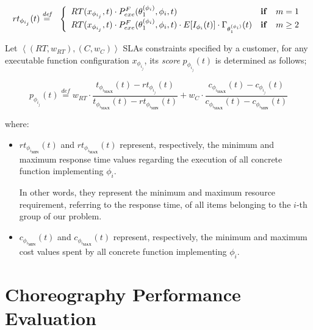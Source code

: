 \documentclass[12pt,a4paper]{report}
\newcommand{\mathDef}{\overset{\textit{def}}{=}}
\begin{document}
\begin{eqnarray}
	rt_{\phi_{i_{j}}}(t) & \mathDef & \left\{ 
	\begin{array}{lcl}
	RT(x_{\phi_{i_{j}}},t) \cdot P_{exe}^{F}(\theta^{(\phi_i)}_1, \phi_i,t) & \text{\textbf{if}} & m = 1 \nonumber \\ 
	RT(x_{\phi_{i_{j}}},t) \cdot P_{exe}^{F}(\theta^{(\phi_i)}_1, \phi_i,t) \cdot E[I_{\phi_i}(t)] \cdot \Gamma_{\theta_1^{(\phi_{i})}}(t) & \text{\textbf{if}} & m \geq 2 \\ 
\end{array} \right.\label{responseTime}\\
\end{eqnarray}

Let $\left\langle (RT,w_{RT}),(C,w_{C}) \right\rangle$ SLAs constraints specified by a customer, for any executable function configuration $x_{\phi_{i_j}}$, its \textit{score} $p_{\phi_{i_{j}}}(t)$ is determined as follows;

\begin{equation}\label{profit}
	p_{\phi_{i_{j}}}(t) \mathDef w_{RT} \cdot \dfrac{t_{\phi_{i_{\textbf{MAX}}}}(t) - rt_{\phi_{i_{j}}}(t)}{t_{\phi_{i_{\textbf{MAX}}}}(t) - rt_{\phi_{i_{\textbf{MIN}}}}(t)} + w_{C} \cdot \dfrac{c_{\phi_{i_{\textbf{MAX}}}}(t) - c_{\phi_{i_{j}}}(t)}{c_{\phi_{i_{\textbf{MAX}}}}(t) - c_{\phi_{i_{\textbf{MIN}}}}(t)}
\end{equation}

where:

\begin{itemize}
	\item $rt_{\phi_{i_{\textbf{MIN}}}}(t)$ and $rt_{\phi_{i_{\textbf{MAX}}}}(t)$ represent, respectively, the minimum and maximum response time values regarding the execution of all concrete function implementing $\phi_i$. 
	
	In other words, they represent the minimum and maximum resource requirement, referring to the response time, of all items belonging to the $i$-th group of our problem.
	
	\item $c_{\phi_{i_{\textbf{MIN}}}}(t)$ and $c_{\phi_{i_{\textbf{MAX}}}}(t)$ represent, respectively, the minimum and maximum cost values spent by all concrete function implementing $\phi_i$.
\end{itemize}




\section{Choreography Performance Evaluation}
\end{document}
